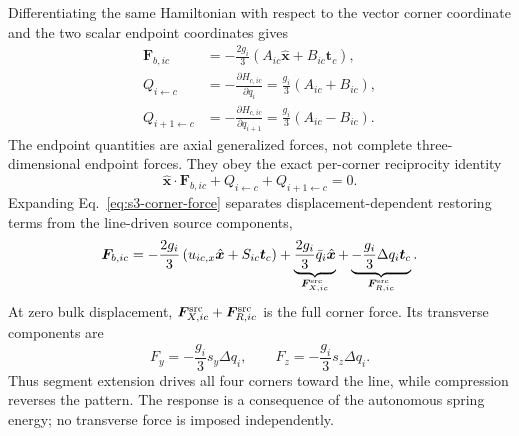 \documentclass[10pt,aps,pre,reprint,floatfix,notitlepage,nofootinbib]{revtex4-2}
\newcommand{\vF}{\bm{F}}
\newcommand{\vt}{\bm{t}}
\newcommand{\ex}{\hat{\bm{x}}}
\begin{document}
Differentiating the same Hamiltonian with respect to the vector corner coordinate and the two scalar endpoint coordinates gives
\begin{align}
  \vF_{b,ic}
  &=-\frac{2g_i}{3}
  \left(A_{ic}\ex+B_{ic}\vt_c\right),
  \label{eq:s3-corner-force}\\
  Q_{i\leftarrow c}
  &=-\frac{\partial H_{c,ic}}{\partial q_i}
   =\frac{g_i}{3}(A_{ic}+B_{ic}),
  \label{eq:s3-left-generalized-force}\\
  Q_{i+1\leftarrow c}
  &=-\frac{\partial H_{c,ic}}{\partial q_{i+1}}
   =\frac{g_i}{3}(A_{ic}-B_{ic}).
  \label{eq:s3-right-generalized-force}
\end{align}
The endpoint quantities are axial generalized forces, not complete three-dimensional endpoint forces.  They obey the exact per-corner reciprocity identity
\begin{equation}
  \ex\!\cdot\vF_{b,ic}
  +Q_{i\leftarrow c}+Q_{i+1\leftarrow c}=0.
  \label{eq:s3-axial-reciprocity}
\end{equation}
Expanding Eq.~\eqref{eq:s3-corner-force} separates displacement-dependent restoring terms from the line-driven source components,
\begin{equation}
  \vF_{b,ic}
  =-\frac{2g_i}{3}
  \left(u_{ic,x}\ex+S_{ic}\vt_c\right)
  +\underbrace{\frac{2g_i}{3}\bar q_i\ex}_{\vF^{\rm src}_{X,ic}}
  +\underbrace{-\frac{g_i}{3}\Delta q_i\vt_c}_{\vF^{\rm src}_{R,ic}}.
  \label{eq:s3-source-split}
\end{equation}
At zero bulk displacement, $\vF^{\rm src}_{X,ic}+\vF^{\rm src}_{R,ic}$ is the full corner force.  Its transverse components are
\begin{equation}
  F_y=-\frac{g_i}{3}s_y\Delta q_i,
  \qquad
  F_z=-\frac{g_i}{3}s_z\Delta q_i.
  \label{eq:s3-initial-transverse-force}
\end{equation}
Thus segment extension drives all four corners toward the line, while compression reverses the pattern.  The response is a consequence of the autonomous spring energy; no transverse force is imposed independently.
\end{document}
